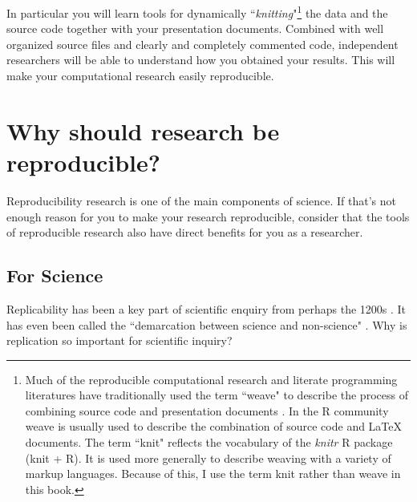 \documentclass[krantz1]{krantz}
\begin{document}
In particular you will learn tools for dynamically ``{\emph{knitting}}"\footnote{Much of the reproducible computational research and literate programming literatures have traditionally used the term ``weave" to describe the process of combining source code and presentation documents \cite[see][101]{Knuth1992}. In the R community weave is usually used to describe the combination of source code and LaTeX documents. The term ``knit" reflects the vocabulary of the {\emph{knitr}} R package (knit + R). It is used more generally to describe weaving with a variety of markup languages. Because of this, I use the term knit rather than weave in this book.} the data and the source code together with your presentation documents. Combined with well organized source files and clearly and completely commented code, independent researchers will be able to understand how you obtained your results. This will make your computational research easily reproducible.


\section{Why should research be reproducible?}

Reproducibility research is one of the main components of science. If that's not enough reason for you to make your research reproducible, consider that the tools of reproducible research also have direct benefits for you as a researcher. 

\subsection{For Science}

Replicability has been a key part of scientific enquiry from perhaps the 1200s \cite[]{Bacon1267,Nosek2012}. It has even been called the ``demarcation between science and non-science" \cite[2]{Braude1979}. Why is replication so important for scientific inquiry? 
\end{document}
